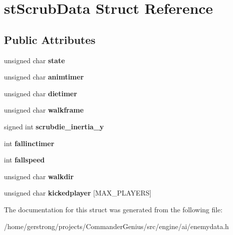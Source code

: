 \hypertarget{structst_scrub_data}{
\section{stScrubData Struct Reference}
\label{structst_scrub_data}
}
\subsection*{Public Attributes}
\begin{DoxyCompactItemize}
\item 
\hypertarget{structst_scrub_data_a52c1d17e5c387d7b2db40d86c63fdc4a}{
unsigned char {\bfseries state}}
\label{structst_scrub_data_a52c1d17e5c387d7b2db40d86c63fdc4a}

\item 
\hypertarget{structst_scrub_data_ae79fc6950324281980cb14e66669b6e7}{
unsigned char {\bfseries animtimer}}
\label{structst_scrub_data_ae79fc6950324281980cb14e66669b6e7}

\item 
\hypertarget{structst_scrub_data_ae119e52b8e54f3fb69852611bd6869d5}{
unsigned char {\bfseries dietimer}}
\label{structst_scrub_data_ae119e52b8e54f3fb69852611bd6869d5}

\item 
\hypertarget{structst_scrub_data_a8f3ccb0df80d0b4c164d9b5f7aed27c4}{
unsigned char {\bfseries walkframe}}
\label{structst_scrub_data_a8f3ccb0df80d0b4c164d9b5f7aed27c4}

\item 
\hypertarget{structst_scrub_data_ac35273ece1c3936f14b49501d3211c23}{
signed int {\bfseries scrubdie\_\-inertia\_\-y}}
\label{structst_scrub_data_ac35273ece1c3936f14b49501d3211c23}

\item 
\hypertarget{structst_scrub_data_a8dd85f3317c1acf99382ce9a1f84dbc2}{
int {\bfseries fallinctimer}}
\label{structst_scrub_data_a8dd85f3317c1acf99382ce9a1f84dbc2}

\item 
\hypertarget{structst_scrub_data_ae8d073735385ab463a6c7cf5af591d5c}{
int {\bfseries fallspeed}}
\label{structst_scrub_data_ae8d073735385ab463a6c7cf5af591d5c}

\item 
\hypertarget{structst_scrub_data_a5d95a1020bedeba8a7d0515134dac8e4}{
unsigned char {\bfseries walkdir}}
\label{structst_scrub_data_a5d95a1020bedeba8a7d0515134dac8e4}

\item 
\hypertarget{structst_scrub_data_a734183aa3bbb3a36c9a9313752d5c058}{
unsigned char {\bfseries kickedplayer} \mbox{[}MAX\_\-PLAYERS\mbox{]}}
\label{structst_scrub_data_a734183aa3bbb3a36c9a9313752d5c058}

\end{DoxyCompactItemize}


The documentation for this struct was generated from the following file:\begin{DoxyCompactItemize}
\item 
/home/gerstrong/projects/CommanderGenius/src/engine/ai/enemydata.h\end{DoxyCompactItemize}
